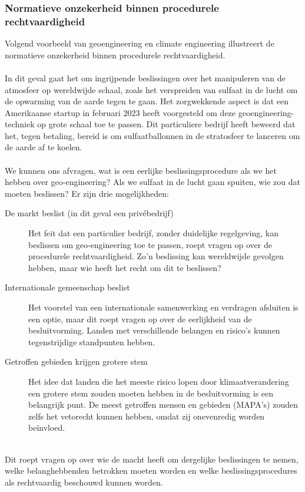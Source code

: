 \documentclass[../summary.tex]{subfiles}
\begin{document}
	\subsubsection{Normatieve onzekerheid binnen procedurele rechtvaardigheid}
	
	Volgend voorbeeld van geoengineering en climate engineering illustreert de normatieve onzekerheid binnen procedurele rechtvaardigheid. \\
	\\
	In dit geval gaat het om ingrijpende beslissingen over het manipuleren van de atmosfeer op wereldwijde schaal, zoals het verspreiden van sulfaat in de lucht om de opwarming van de aarde tegen te gaan. Het zorgwekkende aspect is dat een Amerikaanse startup in februari 2023 heeft voorgesteld om deze geoengineering-techniek op grote schaal toe te passen. Dit particuliere bedrijf heeft beweerd dat het, tegen betaling, bereid is om sulfaatballonnen in de stratosfeer te lanceren om de aarde af te koelen.\\
	\\
	We kunnen ons afvragen, wat is een eerlijke beslissingsprocedure als we het hebben over geo-engineering? Als we sulfaat in de lucht gaan spuiten, wie zou dat moeten beslissen? Er zijn drie mogelijkheden:
	
	\begin{description}
		\item[De markt beslist (in dit geval een privébedrijf)] Het feit dat een particulier bedrijf, zonder duidelijke regelgeving, kan beslissen om geo-engineering toe te passen, roept vragen op over de procedurele rechtvaardigheid. Zo'n beslissing kan wereldwijde gevolgen hebben, maar wie heeft het recht om dit te beslissen?
		\item[Internationale gemeenschap beslist] Het voorstel van een internationale samenwerking en verdragen afsluiten is een optie, maar dit roept vragen op over de eerlijkheid van de besluitvorming. Landen met verschillende belangen en risico's kunnen tegenstrijdige standpunten hebben.
		\item[Getroffen gebieden krijgen grotere stem] Het idee dat landen die het meeste risico lopen door klimaatverandering een grotere stem zouden moeten hebben in de besluitvorming is een belangrijk punt. De meest getroffen mensen en gebieden (MAPA's) zouden zelfs het vetorecht kunnen hebben, omdat zij onevenredig worden beïnvloed.
	\end{description}
	
	\ \\
	Dit roept vragen op over wie de macht heeft om dergelijke beslissingen te nemen, welke belanghebbenden betrokken moeten worden en welke beslissingsprocedures als rechtvaardig beschouwd kunnen worden. \\
	\\
	
\end{document}
